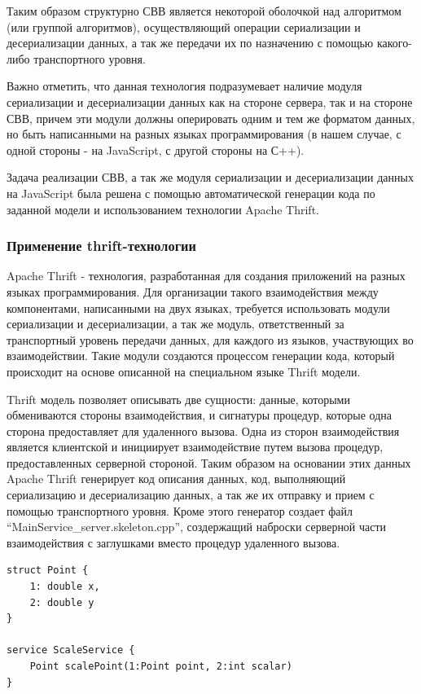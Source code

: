 \documentclass[12pt, a4paper]{article}
\begin{document}
Таким образом структурно СВВ является некоторой оболочкой над алгоритмом (или
группой алгоритмов), осуществляющий операции сериализации и десериализации
данных, а так же передачи их по назначению с помощью какого-либо транспортного
уровня.

Важно отметить, что данная технология подразумевает наличие модуля сериализации
и десериализации данных как на стороне сервера, так и на стороне СВВ, причем
эти модули должны оперировать одним и тем же форматом данных, но быть
написанными на разных языках программирования (в нашем случае, с одной стороны -
на JavaScript, с другой стороны на С++).

Задача реализации СВВ, а так же модуля сериализации и десериализации данных на
JavaScript была решена с помощью автоматической генерации кода по заданной
модели и использованием технологии Apache Thrift.

\subsubsection{Применение thrift-технологии}

Apache Thrift - технология, разработанная для создания приложений на
разных языках программирования. Для организации такого взаимодействия между
компонентами, написанными на двух языках, требуется использовать модули
сериализации и десериализации, а так же модуль, ответственный за транспортный
уровень передачи
данных, для каждого из языков, участвующих во взаимодействии. Такие модули
создаются процессом генерации кода, который происходит на основе описанной на
специальном языке Thrift модели.

Thrift модель позволяет описывать две сущности: данные, которыми обмениваются
стороны взаимодействия, и сигнатуры процедур, которые одна сторона
предоставляет для удаленного вызова. Одна из сторон взаимодействия является
клиентской и инициирует взаимодействие путем вызова процедур, предоставленных
серверной стороной. Таким образом на основании этих данных Apache Thrift
генерирует код описания данных, код, выполняющий сериализацию и десериализацию
данных, а так же их отправку и прием с помощью транспортного уровня. Кроме этого
генератор создает файл ``MainService\_server.skeleton.cpp'', создержащий наброски
серверной части взаимодействия с заглушками вместо процедур удаленного вызова.

\begin{lstlisting}[caption={Пример описания модели и сервиса для технологии
Thrift}]
struct Point {
    1: double x,
    2: double y
}

service ScaleService {
    Point scalePoint(1:Point point, 2:int scalar)
}
\end{lstlisting}
\end{document}
